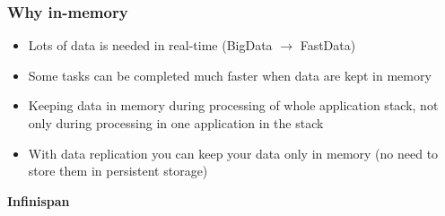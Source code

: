 \documentclass[10pt,utf8]{beamer}
\begin{document}
\begin{frame}
	\frametitle{Why in-memory}
	\begin{itemize}
	 \item Lots of data is needed in real-time (BigData $\rightarrow$ FastData)
	 \pause
	 \item Some tasks can be completed much faster when data are kept in memory
	 \pause
	 \item Keeping data in memory during processing of whole application stack, not only during processing in one application in the stack
	 \pause
	 \item With data replication you can keep your data only in memory (no need to store them in persistent storage)
	\end{itemize}
\end{frame}



\begin{frame}
	\centering
	\huge{\textbf{Infinispan}}
\end{frame}
\end{document}
